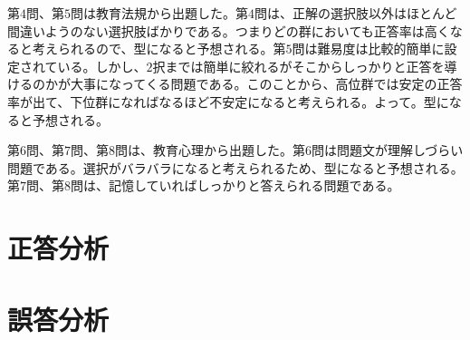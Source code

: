 \documentclass[12pt]{jarticle}
\begin{document}
第$4$問、第$5$問は教育法規から出題した。第$4$問は、正解の選択肢以外はほとんど間違いようのない選択肢ばかりである。つまりどの群においても正答率は高くなると考えられるので、型になると予想される。第$5$問は難易度は比較的簡単に設定されている。しかし、$2$択までは簡単に絞れるがそこからしっかりと正答を導けるのかが大事になってくる問題である。このことから、高位群では安定の正答率が出て、下位群になればなるほど不安定になると考えられる。よって。型になると予想される。

第$6$問、第$7$問、第$8$問は、教育心理から出題した。第$6$問は問題文が理解しづらい問題である。選択がバラバラになると考えられるため、型になると予想される。第$7$問、第$8$問は、記憶していればしっかりと答えられる問題である。

\section{正答分析}
\section{誤答分析}
\end{document}
